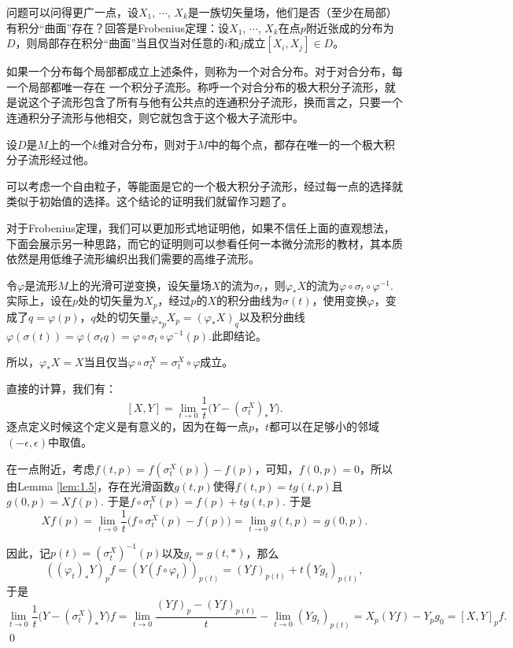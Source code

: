 \para 问题可以问得更广一点，设$X_1$, $\cdots$, $X_k$是一族切矢量场，他们是否（至少在局部）有积分“曲面”存在？回答是Frobenius定理：设$X_1$, $\cdots$, $X_k$在点$p$附近张成的分布为$D$，则局部存在积分“曲面”当且仅当对任意的$i$和$j$成立$[X_i,X_j]\in D$。

如果一个分布每个局部都成立上述条件，则称为一个对合分布。对于对合分布，每一个局部都唯一存在
一个积分子流形。称呼一个对合分布的极大积分子流形，就是说这个子流形包含了所有与他有公共点的连通积分子流形，换而言之，只要一个连通积分子流形与他相交，则它就包含于这个极大子流形中。

\pro 设$D$是$M$上的一个$k$维对合分布，则对于$M$中的每个点，都存在唯一的一个极大积分子流形经过他。

可以考虑一个自由粒子，等能面是它的一个极大积分子流形，经过每一点的选择就类似于初始值的选择。这个结论的证明我们就留作习题了。

\para 对于Frobenius定理，我们可以更加形式地证明他，如果不信任上面的直观想法，下面会展示另一种思路，而它的证明则可以参看任何一本微分流形的教材，其本质依然是用低维子流形编织出我们需要的高维子流形。

\para 令$\varphi$是流形$M$上的光滑可逆变换，设矢量场$X$的流为$\sigma_t$，则$\varphi_*X$的流为$\varphi\circ \sigma_t\circ\varphi^{-1}$. 实际上，设在$p$处的切矢量为$X_p$，经过$p$的$X$的积分曲线为$\sigma(t)$，使用变换$\varphi$，变成了$q=\varphi(p)$，$q$处的切矢量$\varphi_{*p}X_p=(\varphi_*X)_q$以及积分曲线$\varphi(\sigma(t))=\varphi(\sigma_t q)=\varphi\circ\sigma_t\circ \varphi^{-1}(p)$.此即结论。

所以，$\varphi_*X=X$当且仅当$\varphi\circ \sigma^X_t=\sigma^X_t\circ \varphi$成立。

\pro 直接的计算，我们有：
	\[
		[X,Y]=\lim_{t\to 0}\frac{1}{t}\bigl(Y-(\sigma_t^X)_*Y\bigr).
	\]
逐点定义时候这个定义是有意义的，因为在每一点$p$，$t$都可以在足够小的邻域$(-\epsilon,\epsilon)$中取值。

\proof
	在一点附近，考虑$f(t,p)=f(\sigma^X_t(p))-f(p)$，可知，$f(0,p)=0$，所以由Lemma \eqref{lem:1.5}，存在光滑函数$g(t,p)$使得$f(t,p)=tg(t,p)$且$g(0,p)=Xf(p)$. 于是$f\circ \sigma^X_t(p)=f(p)+tg(t,p)$. 于是
	\[
	Xf(p)=\lim_{t\to 0}\frac{1}{t}\bigl(f\circ \sigma^X_t(p)-f(p)\bigr)=\lim_{t\to 0}g(t,p)=g(0,p).
	\]

	因此，记$p(t)=(\sigma^X_t)^{-1}(p)$以及$g_t=g(t,*)$，那么
	\[
	((\varphi_t)_*Y)_p f=(Y(f\circ \varphi_t))_{p(t)}=(Yf)_{p(t)}+t(Yg_t)_{p(t)},
	\]
	于是
	\[
	\lim_{t\to 0}\frac{1}{t}\bigl(Y-(\sigma_t^X)_*Y\bigr)f=\lim_{t\to 0}\frac{(Yf)_p-(Yf)_{p(t)}}{t}-\lim_{t\to 0} (Y g_t)_{p(t)}=X_p(Yf)-Y_pg_0=[X,Y]_pf.
	\]
\qed

